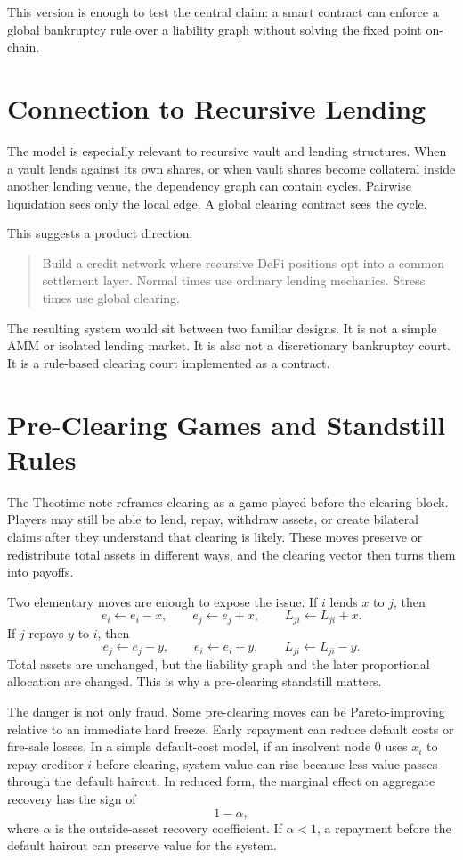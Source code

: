\documentclass[11pt,oneside]{article}
\begin{document}
This version is enough to test the central claim: a smart contract can enforce a
global bankruptcy rule over a liability graph without solving the fixed point
on-chain.

\section{Connection to Recursive Lending}

The model is especially relevant to recursive vault and lending structures.
When a vault lends against its own shares, or when vault shares become collateral
inside another lending venue, the dependency graph can contain cycles. Pairwise
liquidation sees only the local edge. A global clearing contract sees the cycle.

This suggests a product direction:

\begin{quote}
Build a credit network where recursive DeFi positions opt into a common
settlement layer. Normal times use ordinary lending mechanics. Stress times use
global clearing.
\end{quote}

The resulting system would sit between two familiar designs. It is not a simple
AMM or isolated lending market. It is also not a discretionary bankruptcy court.
It is a rule-based clearing court implemented as a contract.

\section{Pre-Clearing Games and Standstill Rules}

The Theotime note reframes clearing as a game played before the clearing block.
Players may still be able to lend, repay, withdraw assets, or create bilateral
claims after they understand that clearing is likely. These moves preserve or
redistribute total assets in different ways, and the clearing vector then turns
them into payoffs.

Two elementary moves are enough to expose the issue. If $i$ lends $x$ to $j$,
then
\[
  e_i\leftarrow e_i-x,\qquad e_j\leftarrow e_j+x,\qquad
  L_{ji}\leftarrow L_{ji}+x.
\]
If $j$ repays $y$ to $i$, then
\[
  e_j\leftarrow e_j-y,\qquad e_i\leftarrow e_i+y,\qquad
  L_{ji}\leftarrow L_{ji}-y.
\]
Total assets are unchanged, but the liability graph and the later proportional
allocation are changed. This is why a pre-clearing standstill matters.

The danger is not only fraud. Some pre-clearing moves can be Pareto-improving
relative to an immediate hard freeze. Early repayment can reduce default costs
or fire-sale losses. In a simple default-cost model, if an insolvent node $0$
uses $x_i$ to repay creditor $i$ before clearing, system value can rise because
less value passes through the default haircut. In reduced form, the marginal
effect on aggregate recovery has the sign of
\[
  1-\alpha,
\]
where $\alpha$ is the outside-asset recovery coefficient. If $\alpha<1$, a
repayment before the default haircut can preserve value for the system.
\end{document}
